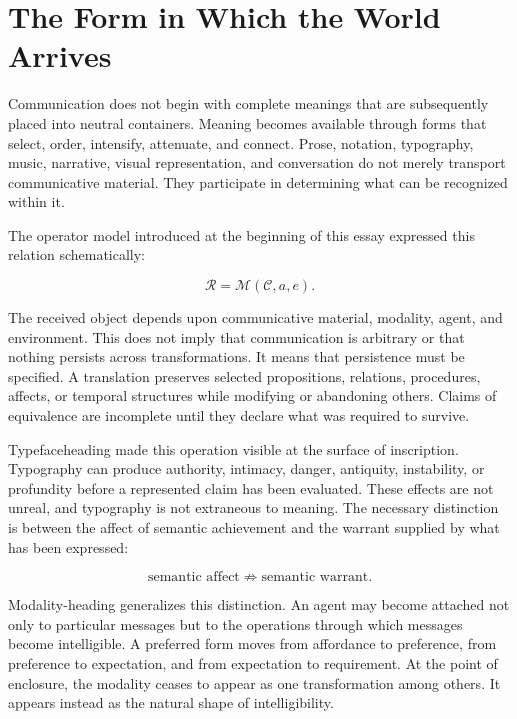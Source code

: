\documentclass[11pt]{article}
\newcommand{\modality}{\mathcal{M}}
\newcommand{\contentobj}{\mathcal{C}}
\newcommand{\receivedobj}{\mathcal{R}}
\begin{document}
\section{The Form in Which the World Arrives}

Communication does not begin with complete meanings that are subsequently
placed into neutral containers. Meaning becomes available through forms that
select, order, intensify, attenuate, and connect. Prose, notation, typography,
music, narrative, visual representation, and conversation do not merely
transport communicative material. They participate in determining what can be
recognized within it.

The operator model introduced at the beginning of this essay expressed this
relation schematically:

\begin{equation}
  \receivedobj=\modality(\contentobj,a,e).
\end{equation}

The received object depends upon communicative material, modality, agent, and
environment. This does not imply that communication is arbitrary or that
nothing persists across transformations. It means that persistence must be
specified. A translation preserves selected propositions, relations,
procedures, affects, or temporal structures while modifying or abandoning
others. Claims of equivalence are incomplete until they declare what was
required to survive.

Typefaceheading made this operation visible at the surface of inscription.
Typography can produce authority, intimacy, danger, antiquity, instability,
or profundity before a represented claim has been evaluated. These effects
are not unreal, and typography is not extraneous to meaning. The necessary
distinction is between the affect of semantic achievement and the warrant
supplied by what has been expressed:

\begin{equation}
  \text{semantic affect}
  \not\Rightarrow
  \text{semantic warrant}.
\end{equation}

Modality-heading generalizes this distinction. An agent may become attached
not only to particular messages but to the operations through which messages
become intelligible. A preferred form moves from affordance to preference,
from preference to expectation, and from expectation to requirement. At the
point of enclosure, the modality ceases to appear as one transformation among
others. It appears instead as the natural shape of intelligibility.
\end{document}
